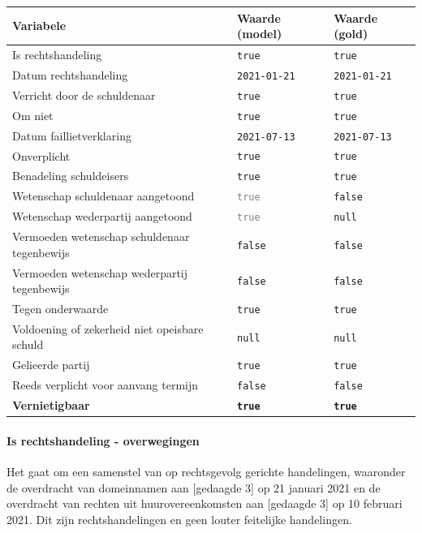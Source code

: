 \documentclass[
  dutch,
  a4paper,
]{article}
\begin{document}
\begin{center}
\small
\begin{tabular}{@{}p{7.4cm}p{2.6cm}p{2.6cm}@{}}
\toprule
Variabele & Waarde (model) & Waarde (gold) \\
\midrule
Is rechtshandeling & \texttt{true} & \texttt{true} \\
Datum rechtshandeling & \texttt{2021-01-21} & \texttt{2021-01-21} \\
Verricht door de schuldenaar & \texttt{true} & \texttt{true} \\
Om niet & \texttt{true} & \texttt{true} \\
Datum faillietverklaring & \texttt{2021-07-13} & \texttt{2021-07-13} \\
Onverplicht & \texttt{true} & \texttt{true} \\
Benadeling schuldeisers & \texttt{true} & \texttt{true} \\
Wetenschap schuldenaar aangetoond & \textcolor{gray}{\texttt{true}} & \texttt{false} \\
Wetenschap wederpartij aangetoond & \textcolor{gray}{\texttt{true}} & \texttt{null} \\
Vermoeden wetenschap schuldenaar tegenbewijs & \texttt{false} & \texttt{false} \\
Vermoeden wetenschap wederpartij tegenbewijs & \texttt{false} & \texttt{false} \\
Tegen onderwaarde & \texttt{true} & \texttt{true} \\
Voldoening of zekerheid niet opeisbare schuld & \texttt{null} & \texttt{null} \\
Gelieerde partij & \texttt{true} & \texttt{true} \\
Reeds verplicht voor aanvang termijn & \texttt{false} & \texttt{false} \\
\textbf{Vernietigbaar} & \textbf{\texttt{true}} & \textbf{\texttt{true}} \\
\bottomrule
\end{tabular}
\end{center}

\paragraph{Is rechtshandeling - overwegingen}\label{is-rechtshandeling---overwegingen-25}

Het gaat om een samenstel van op rechtsgevolg gerichte handelingen, waaronder de overdracht van domeinnamen aan {[}gedaagde 3{]} op 21 januari 2021 en de overdracht van rechten uit huurovereenkomsten aan {[}gedaagde 3{]} op 10 februari 2021. Dit zijn rechtshandelingen en geen louter feitelijke handelingen.
\end{document}
